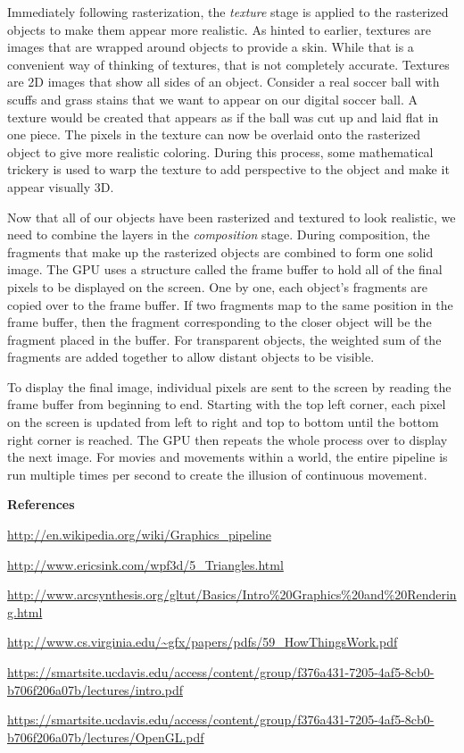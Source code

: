 \documentclass[12pt] {article}
\begin{document}
Immediately following rasterization, the \emph{texture} stage is applied to the rasterized objects to make them appear more realistic. As hinted to earlier, textures are images that are wrapped around objects to provide a skin. While that is a convenient way of thinking of textures, that is not completely accurate. Textures are 2D images that show all sides of an object. Consider a real soccer ball with scuffs and grass stains that we want to appear on our digital soccer ball. A texture would be created that appears as if the ball was cut up and laid flat in one piece. The pixels in the texture can now be overlaid onto the rasterized object to give more realistic coloring. During this process, some mathematical trickery is used to warp the texture to add perspective to the object and make it appear visually 3D.

Now that all of our objects have been rasterized and textured to look realistic, we need to combine the layers in the \emph{composition} stage. During composition, the fragments that make up the rasterized objects are combined to form one solid image. The GPU uses a structure called the frame buffer to hold all of the final pixels to be displayed on the screen. One by one, each object's fragments are copied over to the frame buffer. If two fragments map to the same position in the frame buffer, then the fragment corresponding to the closer object will be the fragment placed in the buffer. For transparent objects, the weighted sum of the fragments are added together to allow distant objects to be visible.


To display the final image, individual pixels are sent to the screen by reading the frame buffer from beginning to end. Starting with the top left corner, each pixel on the screen is updated from left to right and top to bottom until the bottom right corner is reached. The GPU then repeats the whole process over to display the next image. For movies and movements within a world, the entire pipeline is run multiple times per second to create the illusion of continuous movement.


\clearpage
\bf References
\medskip


\url{	http://en.wikipedia.org/wiki/Graphics_pipeline}

\url{http://www.ericsink.com/wpf3d/5_Triangles.html}

\url{http://www.arcsynthesis.org/gltut/Basics/Intro%20Graphics%20and%20Rendering.html}

\url{http://www.cs.virginia.edu/~gfx/papers/pdfs/59_HowThingsWork.pdf}

\url{https://smartsite.ucdavis.edu/access/content/group/f376a431-7205-4af5-8cb0-b706f206a07b/lectures/intro.pdf}

\url{https://smartsite.ucdavis.edu/access/content/group/f376a431-7205-4af5-8cb0-b706f206a07b/lectures/OpenGL.pdf}
\end{document}
